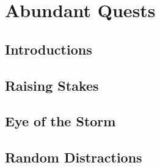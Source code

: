 \documentclass[a4paper,openany]{book}
\begin{document}
%



\printglossary[
  style=mcolindexspannav,
]

\printglossary[
  type=symbols,
  ]

\mainmatter




\clearpage


\chapter{Abundant Quests}

\section{Introductions}
\begin{multicols}{2}
\ifodd\value{temperature}
  
\fi
%

%
\ifodd\value{temperature}
\else
  
\fi
\end{multicols}

\section{Raising Stakes}
\begin{multicols}{2}


\end{multicols}

\section{Eye of the Storm}

\begin{multicols}{2}


\end{multicols}

\section{Random Distractions}


\begin{multicols}{2}


\end{multicols}
\end{document}
